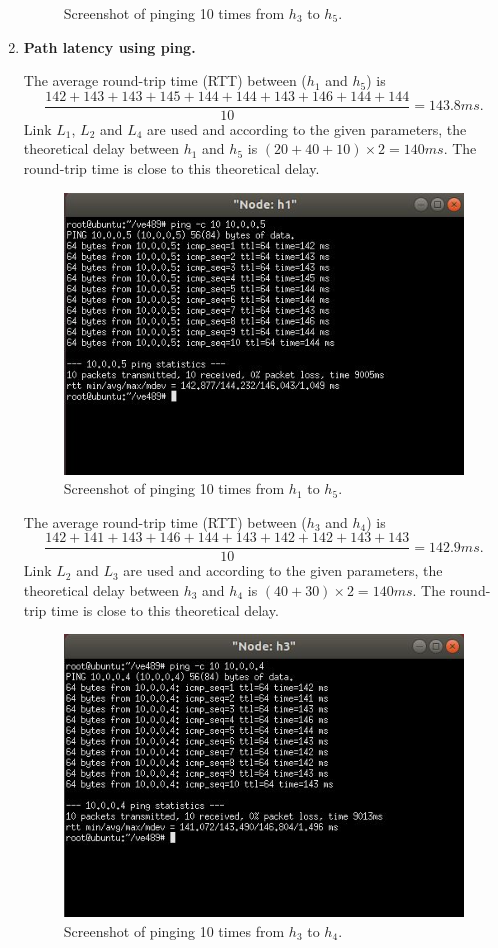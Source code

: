 \documentclass[a4paper]{article}
\begin{document}
\begin{enumerate}
\begin{figure}[htbp]
\caption{Screenshot of pinging 10 times from $h_3$ to $h_5$.}
\end{figure}
\item
\textbf{Path latency using ping.}
\par
The average round-trip time (RTT) between ($h_1$ and $h_5$) is $$\dfrac{142+143+143+145+144+144+143+146+144+144}{10}=143.8ms.$$ Link $L_1$, $L_2$ and $L_4$ are used and according to the given parameters, the theoretical delay between $h_1$ and $h_5$ is $(20+40+10)\times 2=140ms$. The round-trip time is close to this theoretical delay.
\begin{figure}[htbp]
\centering
\includegraphics[scale=1]{3.jpg}
\caption{Screenshot of pinging 10 times from $h_1$ to $h_5$.}
\end{figure}
\par
The average round-trip time (RTT) between ($h_3$ and $h_4$) is $$\dfrac{142+141+143+146+144+143+142+142+143+143}{10}=142.9ms.$$ Link $L_2$ and $L_3$ are used and according to the given parameters, the theoretical delay between $h_3$ and $h_4$ is $(40+30)\times 2=140ms$. The round-trip time is close to this theoretical delay.
\begin{figure}[htbp]
\centering
\includegraphics[scale=1]{4.jpg}
\caption{Screenshot of pinging 10 times from $h_3$ to $h_4$.}
\end{figure}


\end{enumerate}
\end{document}
